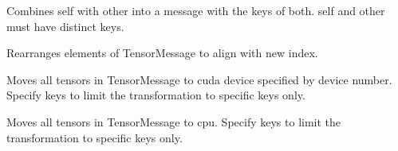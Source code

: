 \documentclass[letterpaper,10pt,english]{sphinxmanual}
\begin{document}
\begin{fulllineitems}
\begin{fulllineitems}
\end{fulllineitems}


\begin{fulllineitems}
\label{\detokenize{Fireworks:Fireworks.core.message.TensorMessage.merge}}
Combines self with other into a message with the keys of both.
self and other must have distinct keys.

\end{fulllineitems}


\begin{fulllineitems}
\label{\detokenize{Fireworks:Fireworks.core.message.TensorMessage.permute}}
Rearranges elements of TensorMessage to align with new index.

\end{fulllineitems}


\begin{fulllineitems}
\label{\detokenize{Fireworks:Fireworks.core.message.TensorMessage.cuda}}
Moves all tensors in TensorMessage to cuda device specified by device number. Specify keys to limit the transformation
to specific keys only.

\end{fulllineitems}


\begin{fulllineitems}
\label{\detokenize{Fireworks:Fireworks.core.message.TensorMessage.cpu}}
Moves all tensors in TensorMessage to cpu. Specify keys to limit the transformation
to specific keys only.

\end{fulllineitems}


\end{fulllineitems}

\end{document}
